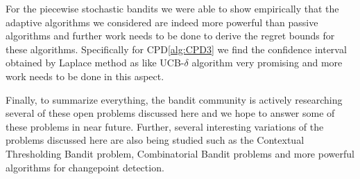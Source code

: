     For the piecewise stochastic bandits we were able to show empirically that the adaptive algorithms we considered are indeed more powerful than passive algorithms and further work needs to be done to derive the regret bounds for these algorithms. Specifically for CPD\ref{alg:CPD3} we find the confidence interval obtained by Laplace method as like UCB-$\delta$ algorithm\citep{abbasi2011improved} very promising and more work needs to be done in this aspect.
    
    Finally, to summarize everything, the bandit community is actively researching several of these open problems discussed here and we hope to answer some of these problems in near future. Further, several interesting variations of the problems discussed here are also being studied such as the Contextual Thresholding Bandit problem, Combinatorial Bandit problems \citep{cesa2012combinatorial} and more powerful algorithms for changepoint detection.

